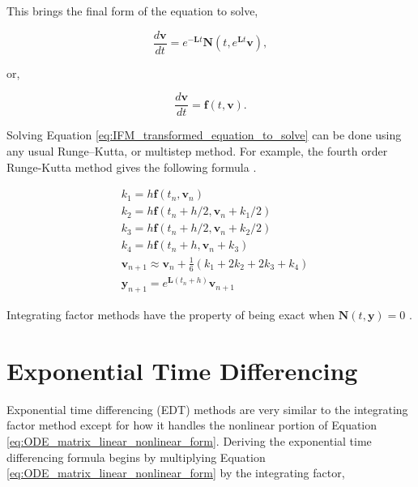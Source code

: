 \noindent
This brings the final form of the equation to solve, 

\begin{equation}
    \frac{d\boldsymbol{v}}{dt} = e^{-\boldsymbol{L}t}\boldsymbol{N}(t,e^{\boldsymbol{L}t}\boldsymbol{v}), 
\end{equation}{}

\noindent
or, 

\begin{equation}
    \frac{d\boldsymbol{v}}{dt} = \boldsymbol{f}(t,\boldsymbol{v}).
    \label{eq:IFM_transformed_equation_to_solve}
\end{equation}{}

Solving Equation \ref{eq:IFM_transformed_equation_to_solve} can be done using any usual Runge–Kutta, or multistep method. For example, the fourth order Runge-Kutta method gives the following formula \cite{Kassam2005}.


\begin{equation}
\begin{split}
    & k_{1} = h\boldsymbol{f}(t_{n},\boldsymbol{v}_{n}) \\
    & k_{2} = h\boldsymbol{f}(t_{n}+h/2, \boldsymbol{v}_{n} + k_{1}/2) \\
    & k_{3} = h\boldsymbol{f}(t_{n}+h/2, \boldsymbol{v}_{n} + k_{2}/2) \\
    & k_{4} = h\boldsymbol{f}(t_{n}+h, \boldsymbol{v}_{n} + k_{3}) \\
    & \boldsymbol{v}_{n+1} \approx \boldsymbol{v}_{n} + \frac{1}{6}(k_{1} + 2k_{2} + 2k_{3} + k_{4}) \\
    & \boldsymbol{y}_{n+1} = e^{\boldsymbol{L} (t_{n}+h)}\boldsymbol{v}_{n+1}
\end{split}
\end{equation}{}

Integrating factor methods have the property of being exact when $\boldsymbol{N}(t,\boldsymbol{y}) = 0$ \cite{ash2009}. 

\section{Exponential Time Differencing}
Exponential time differencing (EDT) methods are very similar to the integrating factor method except for how it handles the nonlinear portion of Equation \ref{eq:ODE_matrix_linear_nonlinear_form}. Deriving the exponential time differencing formula begins by multiplying Equation \ref{eq:ODE_matrix_linear_nonlinear_form} by the integrating factor,


